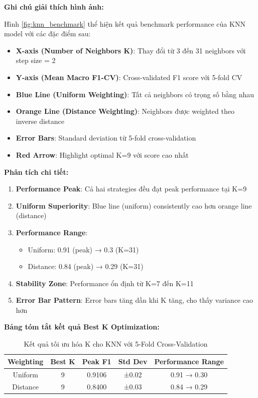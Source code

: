 \textbf{Ghi chú giải thích hình ảnh:}

Hình \ref{fig:knn_benchmark} thể hiện kết quả benchmark performance của KNN model với các đặc điểm sau:

\begin{itemize}
    \item \textbf{X-axis (Number of Neighbors K)}: Thay đổi từ 3 đến 31 neighbors với step size = 2
    \item \textbf{Y-axis (Mean Macro F1-CV)}: Cross-validated F1 score với 5-fold CV
    \item \textbf{Blue Line (Uniform Weighting)}: Tất cả neighbors có trọng số bằng nhau
    \item \textbf{Orange Line (Distance Weighting)}: Neighbors được weighted theo inverse distance
    \item \textbf{Error Bars}: Standard deviation từ 5-fold cross-validation
    \item \textbf{Red Arrow}: Highlight optimal K=9 với score cao nhất
\end{itemize}

\textbf{Phân tích chi tiết:}

\begin{enumerate}
    \item \textbf{Performance Peak}: Cả hai strategies đều đạt peak performance tại K=9
    \item \textbf{Uniform Superiority}: Blue line (uniform) consistently cao hơn orange line (distance)
    \item \textbf{Performance Range}: 
        \begin{itemize}
            \item Uniform: 0.91 (peak) → 0.3 (K=31)
            \item Distance: 0.84 (peak) → 0.29 (K=31)
        \end{itemize}
    \item \textbf{Stability Zone}: Performance ổn định từ K=7 đến K=11
    \item \textbf{Error Bar Pattern}: Error bars tăng dần khi K tăng, cho thấy variance cao hơn
\end{enumerate}

\textbf{Bảng tóm tắt kết quả Best K Optimization:}

\begin{table}[H]
\centering
\begin{tabular}{|c|c|c|c|c|}
\hline
\textbf{Weighting} & \textbf{Best K} & \textbf{Peak F1} & \textbf{Std Dev} & \textbf{Performance Range} \\
\hline
Uniform & 9 & 0.9106 & ±0.02 & 0.91 → 0.30 \\
\hline
Distance & 9 & 0.8400 & ±0.03 & 0.84 → 0.29 \\
\hline
\end{tabular}
\caption{Kết quả tối ưu hóa K cho KNN với 5-Fold Cross-Validation}
\label{tab:knn_optimization_results}
\end{table}

